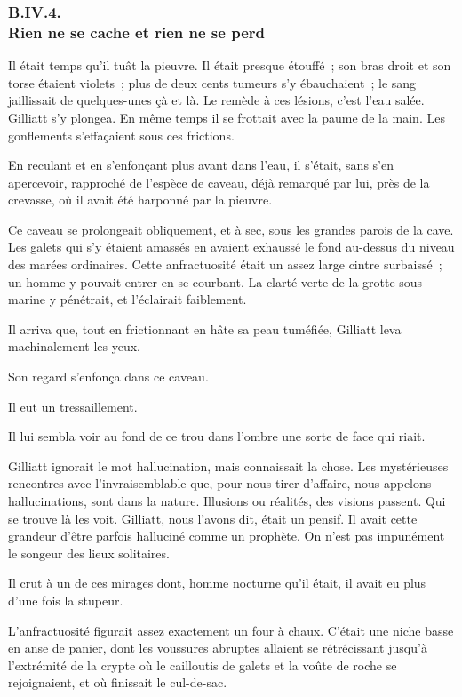 \documentclass[french,twoside]{book} %
\begin{document}
 \subsubsection[{B.IV.4. Rien ne se cache et rien ne se perd}]{B.IV.4. \\
Rien ne se cache et rien ne se perd}
\noindent Il était temps qu’il tuât la pieuvre. Il était presque étouffé ; son bras droit et son torse étaient violets ; plus de deux cents tumeurs s’y ébauchaient ; le sang jaillissait de quelques-unes çà et là. Le remède à ces lésions, c’est l’eau salée. Gilliatt s’y plongea. En même temps il se frottait avec la paume de la main. Les gonflements s’effaçaient sous ces frictions.\par
En reculant et en s’enfonçant plus avant dans l’eau, il s’était, sans s’en apercevoir, rapproché de l’espèce de caveau, déjà remarqué par lui, près de la crevasse, où il avait été harponné par la pieuvre.\par
Ce caveau se prolongeait obliquement, et à sec, sous les grandes parois de la cave. Les galets qui s’y étaient amassés en avaient exhaussé le fond au-dessus du niveau des marées ordinaires. Cette anfractuosité était un assez large cintre surbaissé ; un homme y pouvait entrer en se courbant. La clarté verte de la grotte sous-marine y pénétrait, et l’éclairait faiblement.\par
 Il arriva que, tout en frictionnant en hâte sa peau tuméfiée, Gilliatt leva machinalement les yeux.\par
Son regard s’enfonça dans ce caveau.\par
Il eut un tressaillement.\par
Il lui sembla voir au fond de ce trou dans l’ombre une sorte de face qui riait.\par
Gilliatt ignorait le mot hallucination, mais connaissait la chose. Les mystérieuses rencontres avec l’invraisemblable que, pour nous tirer d’affaire, nous appelons hallucinations, sont dans la nature. Illusions ou réalités, des visions passent. Qui se trouve là les voit. Gilliatt, nous l’avons dit, était un pensif. Il avait cette grandeur d’être parfois halluciné comme un prophète. On n’est pas impunément le songeur des lieux solitaires.\par
Il crut à un de ces mirages dont, homme nocturne qu’il était, il avait eu plus d’une fois la stupeur.\par
L’anfractuosité figurait assez exactement un four à chaux. C’était une niche basse en anse de panier, dont les voussures abruptes allaient se rétrécissant jusqu’à l’extrémité de la crypte où le cailloutis de galets et la voûte de roche se rejoignaient, et où finissait le cul-de-sac.\par
\end{document}
